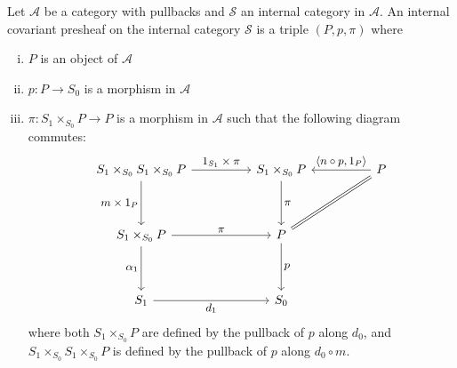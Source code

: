 \begin{definition}
\label{def:InternalPresheaves}
    Let $\mathcal{A}$ be a category with pullbacks and $\mathcal{S}$ an internal category in $\mathcal{A}$. An internal covariant presheaf on the internal category $\mathcal{S}$ is a triple $(P,p,\pi)$ where
    \begin{enumerate}[(i)]
        \item $P$ is an object of $\mathcal{A}$
        \item $p:P\longrightarrow S_0$ is a morphism in $\mathcal{A}$
        \item $\pi:S_1\times_{S_0}P\longrightarrow P$ is a morphism in $\mathcal{A}$ such that the following diagram commutes:
        \begin{equation}
        \label{diag:InternalPresheaves}
            \begin{tikzcd}[every label/.append style = {font = \small}]
                S_1\times_{S_0}S_1\times_{S_0}P \arrow[dd, "m\times 1_P"'] \arrow[rr, "1_{S_1}\times \pi"] & & S_1\times_{S_0}P \arrow[dd, "\pi"] & & P \arrow[ll, "\limitmorph{n\circ p}{1_P}"'] \\ & & & & \\ S_1\times_{S_0}P \arrow[rr, "\pi"] \arrow[dd, "\alpha_1"'] & & P \arrow[dd, "p"] \arrow[rruu, Rightarrow, no head] & & \\ & & & & \\ S_1 \arrow[rr, "d_1"'] & & S_0
            \end{tikzcd}
        \end{equation}
        where both $S_1\times_{S_0}P$ are defined by the pullback of $p$ along $d_0$, and $S_1\times_{S_0}S_1\times_{S_0}P$ is defined by the pullback of $p$ along $d_0\circ m$.
    \end{enumerate}
\end{definition}

